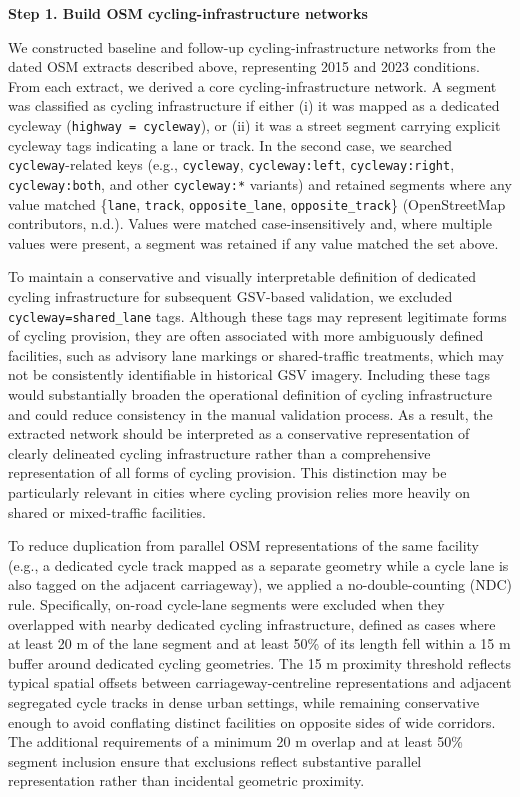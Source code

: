 \documentclass[
]{article}
\begin{document}
\textbf{Step 1. Build OSM cycling-infrastructure networks}

We constructed baseline and follow-up cycling-infrastructure networks
from the dated OSM extracts described above, representing 2015 and 2023
conditions. From each extract, we derived a core cycling-infrastructure
network. A segment was classified as cycling infrastructure if either
(i) it was mapped as a dedicated cycleway
(\texttt{highway\ =\ cycleway}), or (ii) it was a street segment
carrying explicit cycleway tags indicating a lane or track. In the
second case, we searched \texttt{cycleway}-related keys (e.g.,
\texttt{cycleway}, \texttt{cycleway:left}, \texttt{cycleway:right},
\texttt{cycleway:both}, and other \texttt{cycleway:*} variants) and
retained segments where any value matched \{\texttt{lane},
\texttt{track}, \texttt{opposite\_lane}, \texttt{opposite\_track}\}
(OpenStreetMap contributors, n.d.). Values were matched
case-insensitively and, where multiple values were present, a segment
was retained if any value matched the set above.

\color{black}To maintain a conservative and visually interpretable
definition of dedicated cycling infrastructure for subsequent GSV-based
validation, we excluded \texttt{cycleway=shared\_lane} tags. Although
these tags may represent legitimate forms of cycling provision, they are
often associated with more ambiguously defined facilities, such as
advisory lane markings or shared-traffic treatments, which may not be
consistently identifiable in historical GSV imagery. Including these
tags would substantially broaden the operational definition of cycling
infrastructure and could reduce consistency in the manual validation
process. As a result, the extracted network should be interpreted as a
conservative representation of clearly delineated cycling infrastructure
rather than a comprehensive representation of all forms of cycling
provision. This distinction may be particularly relevant in cities where
cycling provision relies more heavily on shared or mixed-traffic
facilities.\color{black}

To reduce duplication from parallel OSM representations of the same
facility (e.g., a dedicated cycle track mapped as a separate geometry
while a cycle lane is also tagged on the adjacent carriageway), we
applied a no-double-counting (NDC) rule. Specifically, on-road
cycle-lane segments were excluded when they overlapped with nearby
dedicated cycling infrastructure, defined as cases where at least 20 m
of the lane segment and at least 50\% of its length fell within a 15 m
buffer around dedicated cycling geometries. The 15 m proximity threshold
reflects typical spatial offsets between carriageway-centreline
representations and adjacent segregated cycle tracks in dense urban
settings, while remaining conservative enough to avoid conflating
distinct facilities on opposite sides of wide corridors. The additional
requirements of a minimum 20 m overlap and at least 50\% segment
inclusion ensure that exclusions reflect substantive parallel
representation rather than incidental geometric proximity.
\end{document}
